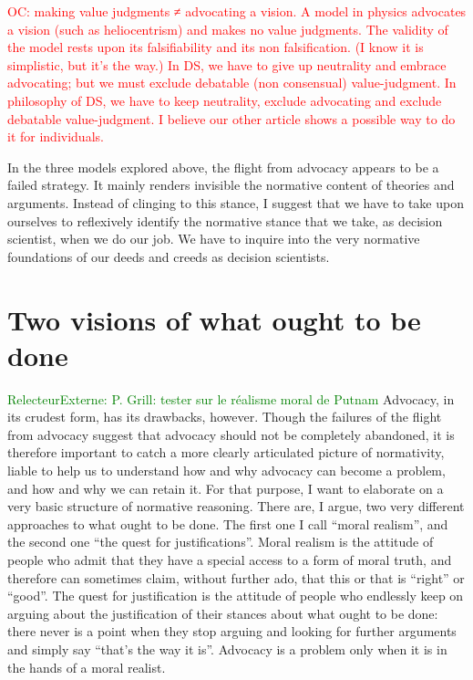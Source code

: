 \documentclass[preprint,11pt]{elsarticle}
\newcommand{\commentOC}[1]{\textcolor{red}{OC: #1}}
\newcommand{\commentE}[1]{\textcolor{green}{RelecteurExterne: #1}}
\begin{document}
\commentOC{making value judgments ≠
advocating a vision. A model in physics advocates a vision
(such as heliocentrism) and makes no value judgments. The
validity of the model rests upon its falsifiability and its non
falsification. (I know it is simplistic, but it’s the way.)
In DS, we have to give up neutrality and embrace
advocating; but we must exclude debatable (non
consensual) value-judgment.
In philosophy of DS, we have to keep neutrality, exclude
advocating and exclude debatable value-judgment. I believe
our other article shows a possible way to do it for
individuals.}

In the three models explored above, the flight from advocacy appears to be a failed strategy. It mainly renders invisible the normative content of theories and arguments. Instead of clinging to this stance, I suggest that we have to take upon ourselves to reflexively identify the normative stance that we take, as decision scientist, when we do our job. We have to inquire into the very normative foundations of our deeds and creeds as decision scientists.

\section{Two visions of what ought to be done}
\commentE{P. Grill: tester sur le réalisme moral de Putnam}
Advocacy, in its crudest form, has its drawbacks, however. Though the failures of the flight from advocacy suggest that advocacy should not be completely abandoned, it is therefore important to catch a more clearly articulated picture of normativity, liable to help us to understand how and why advocacy can become a problem, and how and why we can retain it. For that purpose, I want to elaborate on a very basic structure of normative reasoning. There are, I argue, two very different approaches to what ought to be done. The first one I call “moral realism”, and the second one “the quest for justifications”.
Moral realism is the attitude of people who admit that they have a special access to a form of moral truth, and therefore can sometimes claim, without further ado, that this or that is “right” or “good”. The quest for justification is the attitude of people who endlessly keep on arguing about the justification of their stances about what ought to be done: there never is a point when they stop arguing and looking for further arguments and simply say “that’s the way it is”. Advocacy is a problem only when it is in the hands of a moral realist.
\end{document}
